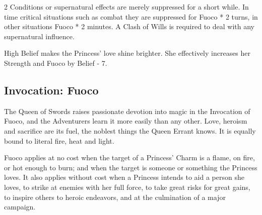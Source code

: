 \begin{multicols}{2}
Conditions or supernatural effects are merely suppressed for a short while. In time critical situations such as combat they are suppressed for Fuoco * 2 turns, in other situations Fuoco * 2 minutes. A Clash of Wills is required to deal with any supernatural influence.

High Belief makes the Princess' love shine brighter. She effectively increases her Strength and Fuoco by Belief - 7.

\subsection*{Invocation: Fuoco}


The Queen of Swords raises passionate devotion into magic in the Invocation of Fuoco, and the Adventurers learn it more easily than any other. Love, heroism and sacrifice are its fuel, the noblest things the Queen Errant knows. It is equally bound to literal fire, heat and light.

Fuoco applies at no cost when the target of a Princess' Charm is a flame, on fire, or hot enough to burn; and when the target is someone or something the Princess loves. It also applies without cost when a Princess intends to aid a person she loves, to strike at enemies with her full force, to take great risks for great gains, to inspire others to heroic endeavors, and at the culmination of a major campaign.


	\bigsidebarstart
	

\end{multicols}
